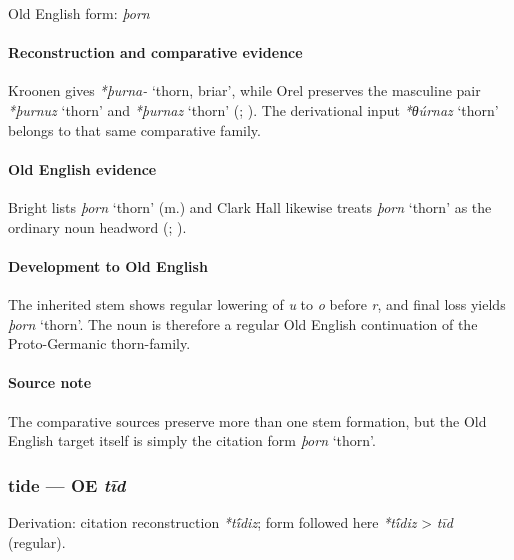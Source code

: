 \documentclass[
  british,
  a4paper,
]{article}
\providecommand{\Recon}[1]{\emph{*#1}}
\begin{document}
Old English form: \emph{þorn}

\paragraph{Reconstruction and comparative
evidence}\label{reconstruction-and-comparative-evidence-60}

Kroonen gives \emph{*þurna-} `thorn, briar', while Orel preserves the
masculine pair \Recon{þurnuz} `thorn' and \Recon{þurnaz} `thorn'
(; ). The derivational input \Recon{θúrnaz} `thorn' belongs to that
same comparative family.

\paragraph{Old English evidence}\label{old-english-evidence-60}

Bright lists \emph{þorn} `thorn' (m.) and Clark Hall likewise treats
\emph{þorn} `thorn' as the ordinary noun headword
(;
).

\paragraph{Development to Old
English}\label{development-to-old-english-60}

The inherited stem shows regular lowering of \emph{u} to \emph{o} before
\emph{r}, and final loss yields \emph{þorn} `thorn'. The noun is
therefore a regular Old English continuation of the Proto-Germanic
thorn-family.

\paragraph{Source note}\label{source-note-5}

The comparative sources preserve more than one stem formation, but the
Old English target itself is simply the citation form \emph{þorn}
`thorn'.

\subsubsection{\texorpdfstring{tide --- OE
\emph{tīd}}{tide --- OE tīd}}\label{tide-oe-tux12bd}

Derivation: citation reconstruction \emph{*tī́diz}; form followed here
\emph{*tī́diz} \textgreater{} \emph{tīd} (regular).
\end{document}
